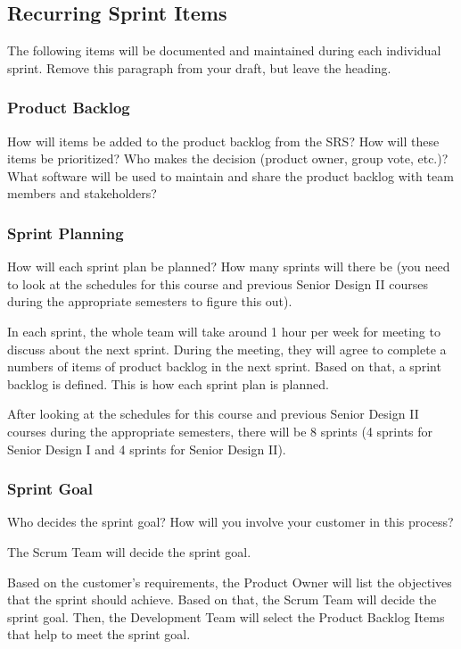 \subsection{Recurring Sprint Items}
The following items will be documented and maintained during each individual sprint. Remove this paragraph from your draft, but leave the heading.

\subsubsection{Product Backlog}
How will items be added to the product backlog from the SRS? How will these items be prioritized? Who makes the decision (product owner, group vote, etc.)? What software will be used to maintain and share the product backlog with team members and stakeholders?

\subsubsection{Sprint Planning}
How will each sprint plan be planned? How many sprints will there be (you need to look at the schedules for this course and previous Senior Design II courses during the appropriate semesters to figure this out).

In each sprint, the whole team will take around 1 hour per week for meeting to discuss about the next sprint. During the meeting, they will agree to complete a numbers of items of product backlog in the next sprint. Based on that, a sprint backlog is defined. This is how each sprint plan is planned. 

After looking at the schedules for this course and previous Senior Design II courses during the appropriate semesters, there will be 8 sprints (4 sprints for Senior Design I and 4 sprints for Senior Design II).

\subsubsection{Sprint Goal}
Who decides the sprint goal? How will you involve your customer in this process?

The Scrum Team will decide the sprint goal.

Based on the customer's requirements, the Product Owner will list the objectives that the sprint should achieve. Based on that, the Scrum Team will decide the sprint goal. Then, the Development Team will select the Product Backlog Items that help to meet the sprint goal. 

